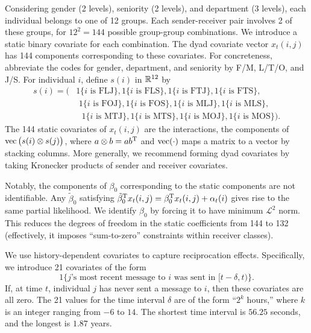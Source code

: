 \documentclass[aoas,preprint]{imsart}
\begin{document}
Considering gender (2 levels), seniority (2 levels), and department
(3 levels), each individual belongs to one of 12 groups.  Each
sender-receiver pair involves 2 of these groups, for $12^2 = 144$ possible
group-group combinations.  We introduce a static binary covariate for each
combination.  The dyad covariate vector $x_t(i,j)$ has 144 components
corresponding to these covariates.  For concreteness, abbreviate the codes
for gender, department, and seniority by F/M, L/T/O, and J/S.  For
individual $i$, define $s(i)$ in $\mathbb{R}^{12}$ by
\begin{align*}
    s(i)
    =
    \big(
        &\text{1\{$i$ is FLJ\}},
        \text{1\{$i$ is FLS\}},
        \text{1\{$i$ is FTJ\}},
        \text{1\{$i$ is FTS\}}, \\
        &\,\,\text{1\{$i$ is FOJ\}},
        \text{1\{$i$ is FOS\}},
        \text{1\{$i$ is MLJ\}},
        \text{1\{$i$ is MLS\}}, \\
        &\,\,\,\,\text{1\{$i$ is MTJ\}},
        \text{1\{$i$ is MTS\}},
        \text{1\{$i$ is MOJ\}},
        \text{1\{$i$ is MOS\}}
    \big).
\end{align*}
The 144 static covariates of $x_t(i,j)$ are the interactions,
the components of $\operatorname*{vec}\big(s(i) \otimes s(j)\big)$, where
$a \otimes b = a b^{\mathrm{T}}$ and $\operatorname*{vec}(\cdot)$ maps a matrix to a vector
by stacking columns.  More generally, we recommend forming
dyad covariates by taking Kronecker products of sender and receiver
covariates.

Notably, the components of $\beta_0$ corresponding to the static
components are not identifiable.  Any $\tilde \beta_0$ satisfying
$\tilde \beta_0^{\mathrm{T}} x_t(i,j) = \beta_0^{\mathrm{T}} x_t(i,j) + \alpha_t(i)$
gives rise to the same partial likelihood.  We identify $\beta_0$ by
forcing it to have minimum $\mathcal{L}^2$ norm.  This reduces the
degrees of freedom in the static coefficients from 144 to 132 (effectively,
it imposes ``sum-to-zero'' constraints within receiver classes).

We use history-dependent covariates to capture reciprocation effects.
Specifically, we introduce 21 covariates of the form
\[
    1\{\text{$j$'s most recent message to $i$ was sent in $[t-\delta, t)$\}}.
\]
If, at time $t$, individual $j$ has never sent a message to $i$, then
these covariates are all zero.  The 21 values for the time interval
$\delta$ are of the form ``$2^k$ hours,'' where $k$ is an integer ranging
from $-6$ to $14$.  The shortest time interval is $56.25$ seconds, and the
longest is $1.87$ years.
\end{document}
